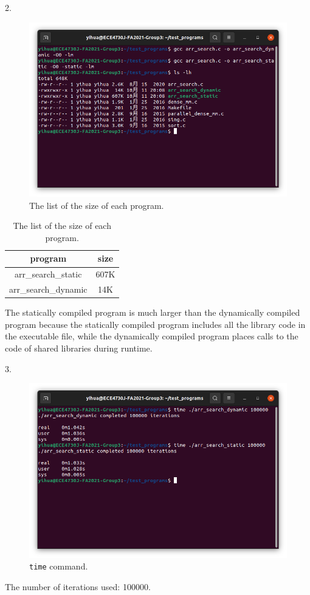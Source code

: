 \documentclass[a4paper]{article}
\begin{document}
2.
\begin{figure}[H]
    \centering
    \includegraphics[width=1\textwidth]{1.png}
    \caption{The list of the size of each program.}
\end{figure}
\begin{table}[H]
    \centering
    \begin{tabular}{|c|c|}
        \hline
        program&size\\
        \hline
        arr\_search\_static&607K\\
        \hline
        arr\_search\_dynamic&14K\\
        \hline
    \end{tabular}
    \caption{The list of the size of each program.}
\end{table}
The statically compiled program is much larger than the dynamically compiled program because the statically compiled program includes all the library code in the executable file, while the dynamically compiled program places calls to the code of shared libraries during runtime.

3.
\begin{figure}[H]
    \centering
    \includegraphics[width=1\textwidth]{2.png}
    \caption{\texttt{time} command.}
\end{figure}
The number of iterations used: 100000.
\end{document}
